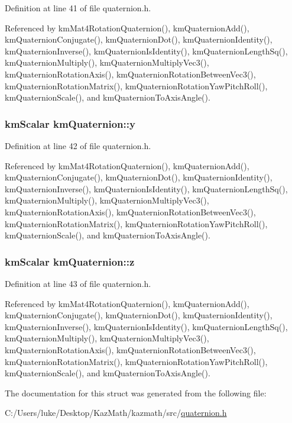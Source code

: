 Definition at line 41 of file quaternion.h.

Referenced by kmMat4RotationQuaternion(), kmQuaternionAdd(), kmQuaternionConjugate(), kmQuaternionDot(), kmQuaternionIdentity(), kmQuaternionInverse(), kmQuaternionIsIdentity(), kmQuaternionLengthSq(), kmQuaternionMultiply(), kmQuaternionMultiplyVec3(), kmQuaternionRotationAxis(), kmQuaternionRotationBetweenVec3(), kmQuaternionRotationMatrix(), kmQuaternionRotationYawPitchRoll(), kmQuaternionScale(), and kmQuaternionToAxisAngle().\hypertarget{structkm_quaternion_6cb097db1a5e24c5e6d7a673dd9b5c68}{
\subsubsection[{y}]{\setlength{\rightskip}{0pt plus 5cm}kmScalar {\bf kmQuaternion::y}}}
\label{structkm_quaternion_6cb097db1a5e24c5e6d7a673dd9b5c68}




Definition at line 42 of file quaternion.h.

Referenced by kmMat4RotationQuaternion(), kmQuaternionAdd(), kmQuaternionConjugate(), kmQuaternionDot(), kmQuaternionIdentity(), kmQuaternionInverse(), kmQuaternionIsIdentity(), kmQuaternionLengthSq(), kmQuaternionMultiply(), kmQuaternionMultiplyVec3(), kmQuaternionRotationAxis(), kmQuaternionRotationBetweenVec3(), kmQuaternionRotationMatrix(), kmQuaternionRotationYawPitchRoll(), kmQuaternionScale(), and kmQuaternionToAxisAngle().\hypertarget{structkm_quaternion_63b2d2685be9e41190fdf45bf21e6690}{
\subsubsection[{z}]{\setlength{\rightskip}{0pt plus 5cm}kmScalar {\bf kmQuaternion::z}}}
\label{structkm_quaternion_63b2d2685be9e41190fdf45bf21e6690}




Definition at line 43 of file quaternion.h.

Referenced by kmMat4RotationQuaternion(), kmQuaternionAdd(), kmQuaternionConjugate(), kmQuaternionDot(), kmQuaternionIdentity(), kmQuaternionInverse(), kmQuaternionIsIdentity(), kmQuaternionLengthSq(), kmQuaternionMultiply(), kmQuaternionMultiplyVec3(), kmQuaternionRotationAxis(), kmQuaternionRotationBetweenVec3(), kmQuaternionRotationMatrix(), kmQuaternionRotationYawPitchRoll(), kmQuaternionScale(), and kmQuaternionToAxisAngle().

The documentation for this struct was generated from the following file:\begin{CompactItemize}
\item 
C:/Users/luke/Desktop/KazMath/kazmath/src/\hyperlink{quaternion_8h}{quaternion.h}\end{CompactItemize}
